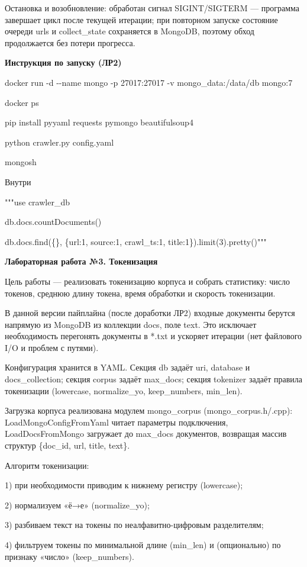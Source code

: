 \documentclass[12pt,a4paper]{article}
\begin{document}
Остановка и возобновление: обработан сигнал SIGINT/SIGTERM --- программа
завершает цикл после текущей итерации; при повторном запуске состояние
очереди urls и collect\_state сохраняется в MongoDB, поэтому обход
продолжается без потери прогресса.

\textbf{Инструкция по запуску (ЛР2)}

docker run -d -\/-name mongo -p 27017:27017 -v mongo\_data:/data/db
mongo:7

docker ps

pip install pyyaml requests pymongo beautifulsoup4

python crawler.py config.yaml

mongosh

Внутри

"""use crawler\_db

db.docs.countDocuments()

db.docs.find(\{\}, \{url:1, source:1, crawl\_ts:1,
title:1\}).limit(3).pretty()"""

\textbf{Лабораторная работа №3. Токенизация}

Цель работы --- реализовать токенизацию корпуса и собрать статистику:
число токенов, среднюю длину токена, время обработки и скорость
токенизации.

В данной версии пайплайна (после доработки ЛР2) входные документы
берутся напрямую из MongoDB из коллекции docs, поле text. Это исключает
необходимость перегонять документы в *.txt и ускоряет итерации (нет
файлового I/O и проблем с путями).

Конфигурация хранится в YAML. Секция db задаёт uri, database и
docs\_collection; секция corpus задаёт max\_docs; секция tokenizer
задаёт правила токенизации (lowercase, normalize\_yo, keep\_numbers,
min\_len).

Загрузка корпуса реализована модулем mongo\_corpus
(mongo\_corpus.h/.cpp): LoadMongoConfigFromYaml читает параметры
подключения, LoadDocsFromMongo загружает до max\_docs документов,
возвращая массив структур \{doc\_id, url, title, text\}.

Алгоритм токенизации:

1) при необходимости приводим к нижнему регистру (lowercase);

2) нормализуем «ё→е» (normalize\_yo);

3) разбиваем текст на токены по неалфавитно-цифровым разделителям;

4) фильтруем токены по минимальной длине (min\_len) и (опционально) по
признаку «число» (keep\_numbers).
\end{document}
